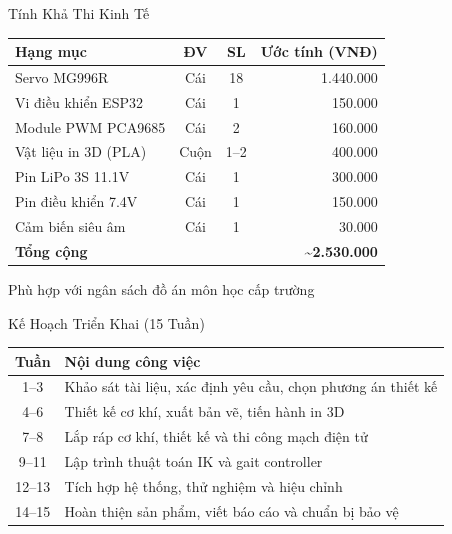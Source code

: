 \begin{frame}{Tính Khả Thi Kinh Tế}
  \centering
  \begin{tabular}{lccr}
    \toprule
    \textbf{Hạng mục} & \textbf{ĐV} & \textbf{SL} & \textbf{Ước tính (VNĐ)} \\
    \midrule
    Servo MG996R         & Cái   & 18  & 1.440.000 \\
    Vi điều khiển ESP32  & Cái   & 1   &   150.000 \\
    Module PWM PCA9685   & Cái   & 2   &   160.000 \\
    Vật liệu in 3D (PLA) & Cuộn  & 1--2 &   400.000 \\
    Pin LiPo 3S 11.1V    & Cái   & 1   &   300.000 \\
    Pin điều khiển 7.4V  & Cái   & 1   &   150.000 \\
    Cảm biến siêu âm     & Cái   & 1   &    30.000 \\
    \midrule
    \textbf{Tổng cộng}   &       &     & \textbf{\textasciitilde{}2.530.000} \\
    \bottomrule
  \end{tabular}
  \vspace{0.4cm}

  \alert{Phù hợp với ngân sách đồ án môn học cấp trường}
\end{frame}

\begin{frame}{Kế Hoạch Triển Khai (15 Tuần)}
  \centering
  \begin{tabular}{cl}
    \toprule
    \textbf{Tuần} & \textbf{Nội dung công việc} \\
    \midrule
    1--3   & Khảo sát tài liệu, xác định yêu cầu, chọn phương án thiết kế \\
    4--6   & Thiết kế cơ khí, xuất bản vẽ, tiến hành in 3D \\
    7--8   & Lắp ráp cơ khí, thiết kế và thi công mạch điện tử \\
    9--11  & Lập trình thuật toán IK và gait controller \\
    12--13 & Tích hợp hệ thống, thử nghiệm và hiệu chỉnh \\
    14--15 & Hoàn thiện sản phẩm, viết báo cáo và chuẩn bị bảo vệ \\
    \bottomrule
  \end{tabular}
\end{frame}

